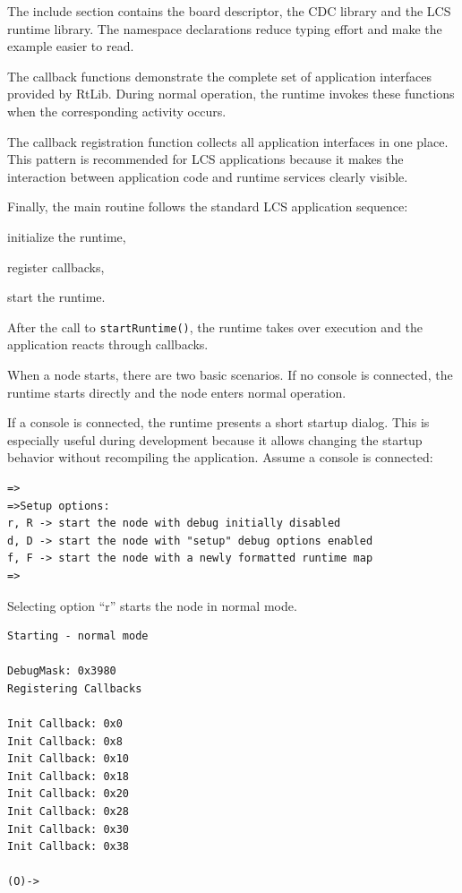 The include section contains the board descriptor, the CDC library and the LCS
runtime library. The namespace declarations reduce typing effort and make the
example easier to read.

The callback functions demonstrate the complete set of application interfaces
provided by RtLib. During normal operation, the runtime invokes these functions
when the corresponding activity occurs.

The callback registration function collects all application interfaces in one
place. This pattern is recommended for LCS applications because it makes the
interaction between application code and runtime services clearly visible.

Finally, the main routine follows the standard LCS application sequence:

\begin{smallGapEnumerate}
\item initialize the runtime,
\item register callbacks,
\item start the runtime.
\end{smallGapEnumerate}

After the call to \texttt{startRuntime()}, the runtime takes over execution and
the application reacts through callbacks.


When a node starts, there are two basic scenarios. If no console is connected,
the runtime starts directly and the node enters normal operation.

If a console is connected, the runtime presents a short startup dialog. This is
especially useful during development because it allows changing the startup
behavior without recompiling the application. Assume a console is connected:

\begin{lstlisting}[style=codesnippetstyle]
=>
=>Setup options:
r, R -> start the node with debug initially disabled
d, D -> start the node with "setup" debug options enabled
f, F -> start the node with a newly formatted runtime map
=>
\end{lstlisting}

Selecting option ``r'' starts the node in normal mode.

\begin{lstlisting}[style=codesnippetstyle]
Starting - normal mode

DebugMask: 0x3980
Registering Callbacks

Init Callback: 0x0
Init Callback: 0x8
Init Callback: 0x10
Init Callback: 0x18
Init Callback: 0x20
Init Callback: 0x28
Init Callback: 0x30
Init Callback: 0x38

(O)->
\end{lstlisting}

